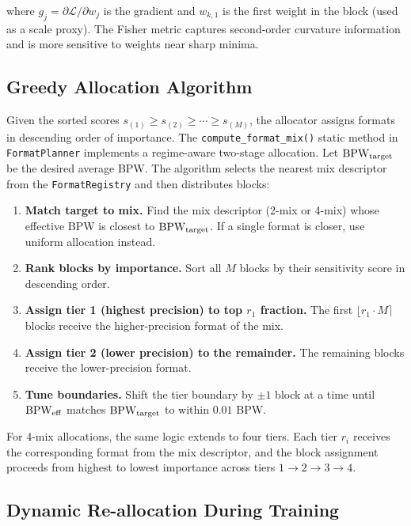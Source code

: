 \noindent where $g_j = \partial \mathcal{L} / \partial w_j$ is the
gradient and $w_{k,1}$ is the first weight in the block (used as a
scale proxy).  The Fisher metric captures second-order curvature
information and is more sensitive to weights near sharp minima.

\subsection{Greedy Allocation Algorithm}

Given the sorted scores $s_{(1)} \geq s_{(2)} \geq \cdots \geq
s_{(M)}$, the allocator assigns formats in descending order of
importance.  The \texttt{compute\_format\_mix()} static method in
\texttt{FormatPlanner} implements a regime-aware two-stage allocation.
Let $\textnormal{BPW}_{\text{target}}$ be the desired average BPW.  The algorithm
selects the nearest mix descriptor from the \texttt{FormatRegistry} and
then distributes blocks:

\begin{enumerate}
    \item \textbf{Match target to mix.}  Find the mix descriptor
    (2-mix or 4-mix) whose effective BPW is closest to
    $\textnormal{BPW}_{\text{target}}$.  If a single format is closer, use
    uniform allocation instead.
    \item \textbf{Rank blocks by importance.}  Sort all $M$ blocks
    by their sensitivity score in descending order.
    \item \textbf{Assign tier 1 (highest precision) to top $r_1$
    fraction.}  The first $\lfloor r_1 \cdot M \rceil$ blocks receive
    the higher-precision format of the mix.
    \item \textbf{Assign tier 2 (lower precision) to the remainder.}
    The remaining blocks receive the lower-precision format.
    \item \textbf{Tune boundaries.}  Shift the tier boundary by
    $\pm 1$ block at a time until $\textnormal{BPW}_{\text{eff}}$ matches
    $\textnormal{BPW}_{\text{target}}$ to within $0.01$ BPW.
\end{enumerate}

For 4-mix allocations, the same logic extends to four tiers.  Each tier
$r_i$ receives the corresponding format from the mix descriptor, and the
block assignment proceeds from highest to lowest importance across tiers
$1 \to 2 \to 3 \to 4$.

\subsection{Dynamic Re-allocation During Training}

